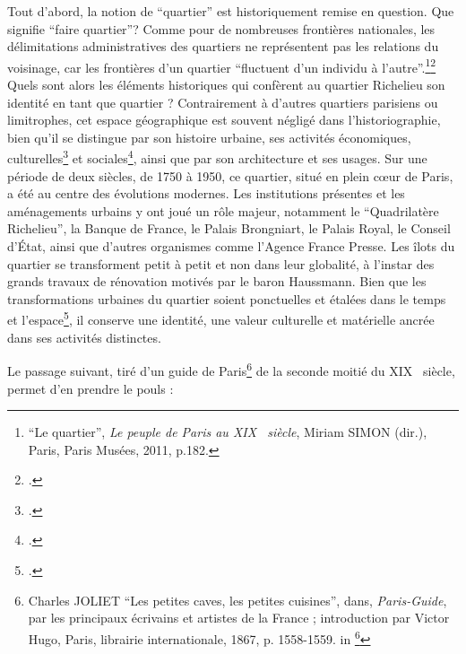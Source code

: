 Tout d'abord, la notion de \enquote{quartier} est historiquement remise en question. Que signifie \enquote{faire quartier}? Comme pour de nombreuses frontières nationales, les délimitations administratives des quartiers ne représentent pas les relations du voisinage, car les frontières d'un quartier \enquote{fluctuent d'un individu à l'autre}.\footnote{\enquote{Le quartier}, \textit{Le peuple de Paris au XIX\ieme~  siècle}, Miriam SIMON (dir.), Paris, Paris Musées, 2011, p.182.}\footcite{JAKOBOWICZpeuple2011} 
Quels sont alors les éléments historiques qui confèrent au quartier Richelieu son identité en tant que quartier ?  Contrairement à d'autres quartiers parisiens ou limitrophes, cet espace géographique est souvent négligé dans l'historiographie, bien qu'il se distingue par son histoire urbaine, ses activités économiques, culturelles\footcite{GRESILLONVille2008} et sociales\footcite{DIMEOgeographie2008, INHAJournee2023, INHAJournee2023a}, ainsi que par son architecture et ses usages. Sur une période de deux siècles, de 1750 à 1950, ce quartier, situé en plein cœur de Paris, a été au centre des évolutions modernes. Les institutions présentes et les aménagements urbains y ont joué un rôle majeur, notamment le \enquote{Quadrilatère Richelieu}, la Banque de France, le Palais Brongniart, le Palais Royal, le Conseil d'État, ainsi que d'autres organismes comme l'Agence France Presse. Les îlots du quartier se transforment petit à petit et non dans leur globalité, à l'instar des grands travaux de rénovation motivés par le baron Haussmann. Bien que les transformations urbaines du quartier soient ponctuelles et étalées dans le temps et l'espace\footcite{CARBONNIERderoulement2015}, il conserve une identité, une valeur culturelle et matérielle ancrée dans ses activités distinctes.

Le passage suivant, tiré d'un guide de Paris\footnote{Charles JOLIET \enquote{Les petites caves, les petites cuisines}, dans, \textit{Paris-Guide}, par les principaux écrivains et artistes de la France ; introduction par Victor Hugo, Paris, librairie internationale, 1867, p. 1558-1559. in \footcite{DUVETTEquartier2024}} de la seconde moitié du XIX\ieme~  siècle, permet d'en prendre le pouls : 

